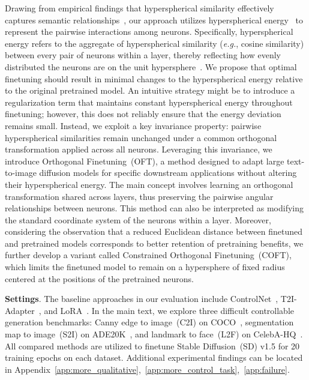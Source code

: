 \begin{itemize}[leftmargin=*,nosep]
Drawing from empirical findings that hyperspherical similarity effectively captures semantic relationships~\cite{liu2017deep,liu2018decoupled,chen2020angular}, our approach utilizes hyperspherical energy~\cite{liu2018learning} to represent the pairwise interactions among neurons. Specifically, hyperspherical energy refers to the aggregate of hyperspherical similarity (\emph{e.g.}, cosine similarity) between every pair of neurons within a layer, thereby reflecting how evenly distributed the neurons are on the unit hypersphere~\cite{liu2021learning}. We propose that optimal finetuning should result in minimal changes to the hyperspherical energy relative to the original pretrained model. An intuitive strategy might be to introduce a regularization term that maintains constant hyperspherical energy throughout finetuning; however, this does not reliably ensure that the energy deviation remains small. Instead, we exploit a key invariance property: pairwise hyperspherical similarities remain unchanged under a common orthogonal transformation applied across all neurons. Leveraging this invariance, we introduce Orthogonal Finetuning~(OFT), a method designed to adapt large text-to-image diffusion models for specific downstream applications without altering their hyperspherical energy. The main concept involves learning an orthogonal transformation shared across layers, thus preserving the pairwise angular relationships between neurons. This method can also be interpreted as modifying the standard coordinate system of the neurons within a layer. Moreover, considering the observation that a reduced Euclidean distance between finetuned and pretrained models corresponds to better retention of pretraining benefits, we further develop a variant called Constrained Orthogonal Finetuning~(COFT), which limits the finetuned model to remain on a hypersphere of fixed radius centered at the positions of the pretrained neurons.

\textbf{Settings}. The baseline approaches in our evaluation include ControlNet~\cite{zhang2023adding}, T2I-Adapter~\cite{mou2023t2i}, and LoRA~\cite{hulora2022}. In the main text, we explore three difficult controllable generation benchmarks: Canny edge to image~(C2I) on COCO~\cite{lin2014microsoft}, segmentation map to image~(S2I) on ADE20K~\cite{zhou2017scene}, and landmark to face~(L2F) on CelebA-HQ~\cite{karras2018progressive,xia2021tedigan}. All compared methods are utilized to finetune Stable Diffusion~(SD) v1.5 for 20 training epochs on each dataset. Additional experimental findings can be located in Appendix~\ref{app:more_qualitative},~\ref{app:more_control_task},~\ref{app:failure}.


\end{itemize}
